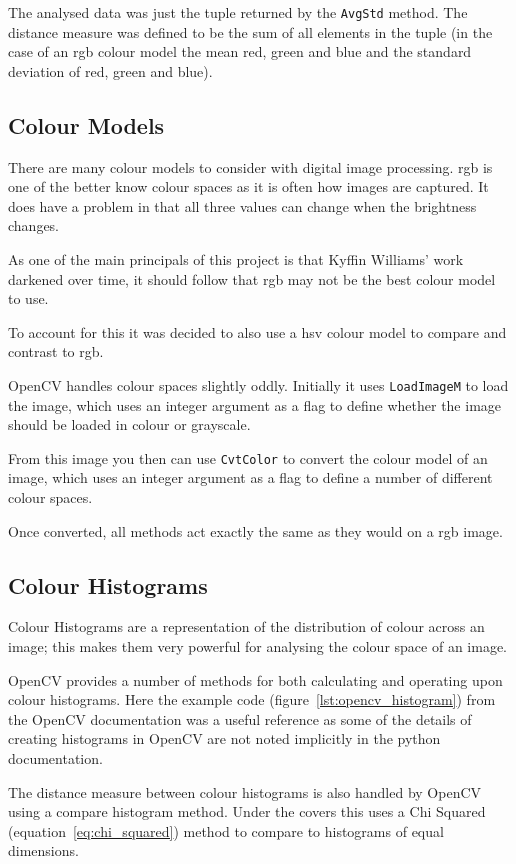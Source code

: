 The analysed data was just the tuple returned by the \texttt{AvgStd} method. The distance measure
was defined to be the sum of all elements in the tuple (in the case of an \gls{rgb} colour model
the mean red, green and blue and the standard deviation of red, green and blue).

\subsection{Colour Models}
There are many colour models to consider with digital image processing. \Gls{rgb} is one of the
better know colour spaces as it is often how images are captured. It does have a problem in that
all three values can change when the brightness changes.

As one of the main principals of this project is that Kyffin Williams' work darkened over time, it
should follow that \gls{rgb} may not be the best colour model to use.

To account for this it was decided to also use a \gls{hsv} colour model to compare and contrast to
\gls{rgb}.

OpenCV handles colour spaces slightly oddly. Initially it uses \texttt{LoadImageM} to load the 
image, which uses an integer argument as a flag to define whether the image should be loaded in 
colour or grayscale.

From this image you then can use \texttt{CvtColor} to convert the colour model of an image, which 
uses an integer argument as a flag to define a number of different colour spaces.

Once converted, all methods act exactly the same as they would on a \gls{rgb} image.

\subsection{Colour Histograms}
Colour Histograms are a representation of the distribution of colour across an image; this makes
them very powerful for analysing the colour space of an image.

OpenCV provides a number of methods for both calculating and operating upon colour histograms. 
Here the example code (figure~\ref{lst:opencv_histogram}) from the OpenCV documentation was a
useful reference as some of the details of creating histograms in OpenCV are not noted implicitly
in the python documentation.

The distance measure between colour histograms is also handled by OpenCV using a compare histogram
method. Under the covers this uses a Chi Squared (equation~\ref{eq:chi_squared}) method to
compare to histograms of equal dimensions.

